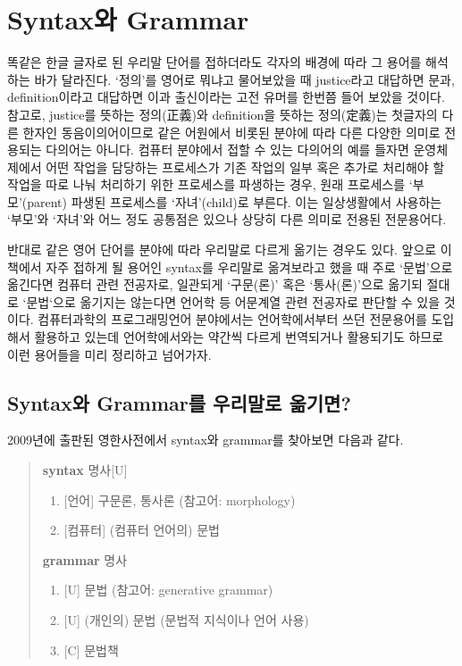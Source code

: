 
\chapter{Syntax와 Grammar}
\label{chap:SyntaxGrammar}
똑같은 한글 글자로 된 우리말 단어를 접하더라도 각자의 배경에 따라
그 용어를 해석하는 바가 달라진다. `정의'를 영어로 뭐냐고 물어보았을 때
justice라고 대답하면 문과, definition이라고 대답하면 이과 출신이라는
고전 유머를 한번쯤 들어 보았을 것이다. 참고로,
justice를 뜻하는 정의(正義)와 definition을 뜻하는 정의(定義)는
첫글자의 다른 한자인 동음이의어이므로 같은 어원에서 비롯된
분야에 따라 다른 다양한 의미로 전용되는 다의어는 아니다.
컴퓨터 분야에서 접할 수 있는 다의어의 예를 들자면 운영체제에서
어떤 작업을 담당하는 프로세스가 기존 작업의 일부 혹은 추가로
처리해야 할 작업을 따로 나눠 처리하기 위한 프로세스를 파생하는 경우,
원래 프로세스를 `부모'(parent) 파생된 프로세스를 `자녀'(child)로 부른다.
이는 일상생활에서 사용하는 `부모'와 `자녀'와 어느 정도 공통점은 있으나
상당히 다른 의미로 전용된 전문용어다.

반대로 같은 영어 단어를 분야에 따라 우리말로 다르게 옮기는 경우도 있다.
앞으로 이 책에서 자주 접하게 될 용어인
syntax를 우리말로 옮겨보라고 했을 때 주로
`문법'으로 옮긴다면 컴퓨터 관련 전공자로,
일관되게 `구문(론)' 혹은 `통사(론)'으로 옮기되 절대로 `문법`으로
옮기지는 않는다면 언어학 등 어문계열 관련 전공자로 판단할 수 있을 것이다.
컴퓨터과학의 프로그래밍언어 분야에서는 언어학에서부터 쓰던 전문용어를
도입해서 활용하고 있는데 언어학에서와는 약간씩 다르게 번역되거나
활용되기도 하므로 이런 용어들을 미리 정리하고 넘어가자.


\section{Syntax와 Grammar를 우리말로 옮기면?}
%
%
%
%
%
%
2009년에 출판된 영한사전\cite{OxEKdict}에서 syntax와 grammar를 찾아보면 다음과 같다.
\begin{quote}
    \textbf{syntax} 명사[U] \vspace{-1ex}
    \begin{enumerate}\tightlist
    \item{} [언어] 구문론, 통사론 (참고어: morphology)
    \item{} [컴퓨터] (컴퓨터 언어의) 문법
    \end{enumerate}
    \textbf{grammar} 명사 \vspace{-1ex}
    \begin{enumerate}\tightlist
    \item{} [U] 문법 (참고어: generative grammar)
    \item{} [U] (개인의) 문법 (문법적 지식이나 언어 사용)
    \item{} [C] 문법책
    \end{enumerate}
\end{quote}

